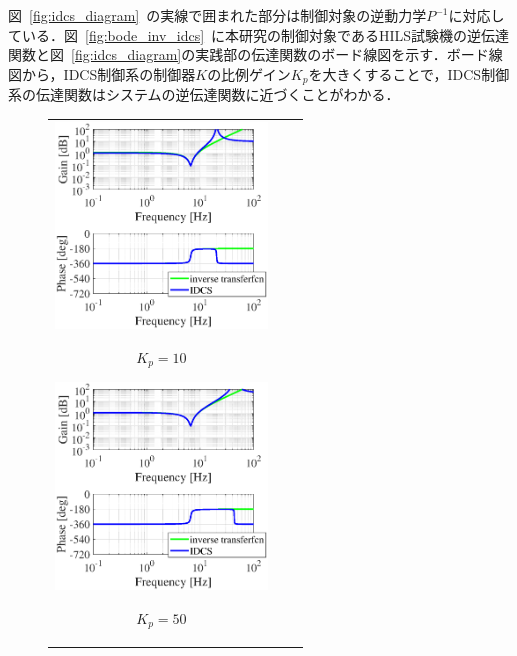 \documentclass[a4paper,12pt]{article_vdlab_sotsuron}
\begin{document}
\newpage
図~\ref{fig:idcs_diagram}~の実線で囲まれた部分は制御対象の逆動力学$P^{-1}$に対応している．図~\ref{fig:bode_inv_idcs}~に本研究の制御対象であるHILS試験機の逆伝達関数と図~\ref{fig:idcs_diagram}の実践部の伝達関数のボード線図を示す．ボード線図から，IDCS制御系の制御器$K$の比例ゲイン$K_p$を大きくすることで，IDCS制御系の伝達関数はシステムの逆伝達関数に近づくことがわかる．

\vspace*{5mm}
\begin{figure}[h]
  \begin{tabular}{ccc}
  \begin{minipage}{0.33\hsize}
  \begin{center}
    \includegraphics[height=55mm]{figure/bode_inverse_Kp10.eps}
    \end{center}
    \begin{center}
    \ $K_p=10$\
    \end{center}
  \end{minipage}
  \begin{minipage}{0.33\hsize}
  \begin{center}
    \includegraphics[height=55mm]{figure/bode_inverse_Kp50.eps}
    \end{center}
    \begin{center}
    \ $K_p=50$\
    \end{center}
  \end{minipage}
  \begin{minipage}{0.33\hsize}

\end{minipage}
\end{tabular}
\end{figure}
\end{document}
